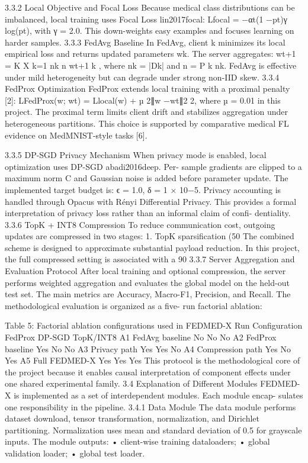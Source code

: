 3.3.2
Local Objective and Focal Loss
Because medical class distributions can be imbalanced, local training uses Focal Loss lin2017focal:
Lfocal = −αt(1 −pt)γ log(pt), with γ = 2.0. This down-weights easy examples and focuses learning on harder samples.
3.3.3
FedAvg Baseline
In FedAvg, client k minimizes its local empirical loss and returns updated parameters wk. The server aggregates:
wt+1 =
K
X k=1 nk n wt+1 k
, where nk = |Dk| and n = P k nk. FedAvg is effective under mild heterogeneity but can degrade under strong non-IID skew.
3.3.4
FedProx Optimization
FedProx extends local training with a proximal penalty [2]:
LFedProx(w; wt) = Llocal(w) + µ 2∥w −wt∥2 2, where µ = 0.01 in this project. The proximal term limits client drift and stabilizes aggregation under heterogeneous partitions. This choice is supported by comparative medical FL evidence on MedMNIST-style tasks [6].

3.3.5
DP-SGD Privacy Mechanism
When privacy mode is enabled, local optimization uses DP-SGD abadi2016deep. Per- sample gradients are clipped to a maximum norm C and Gaussian noise is added before parameter update. The implemented target budget is:
ϵ = 1.0, δ = 1 × 10−5.
Privacy accounting is handled through Opacus with Rényi Differential Privacy. This provides a formal interpretation of privacy loss rather than an informal claim of confi- dentiality.
3.3.6
TopK + INT8 Compression
To reduce communication cost, outgoing updates are compressed in two stages:
1. TopK sparsification (50%
The combined scheme is designed to approximate substantial payload reduction. In this project, the full compressed setting is associated with a 90%
3.3.7
Server Aggregation and Evaluation Protocol
After local training and optional compression, the server performs weighted aggregation and evaluates the global model on the held-out test set. The main metrics are Accuracy,
Macro-F1, Precision, and Recall. The methodological evaluation is organized as a five- run factorial ablation:

Table 5: Factorial ablation configurations used in FEDMED-X
Run
Configuration
FedProx
DP-SGD
TopK/INT8
A1
FedAvg baseline
No
No
No
A2
FedProx baseline
Yes
No
No
A3
Privacy path
Yes
Yes
No
A4
Compression path
Yes
No
Yes
A5
Full FEDMED-X
Yes
Yes
Yes
This protocol is the methodological core of the project because it enables causal interpretation of component effects under one shared experimental family.
3.4
Explanation of Different Modules
FEDMED-X is implemented as a set of interdependent modules. Each module encap- sulates one responsibility in the pipeline.
3.4.1
Data Module
The data module performs dataset download, tensor transformation, normalization, and Dirichlet partitioning. Normalization uses mean and standard deviation of 0.5 for grayscale inputs. The module outputs:
• client-wise training dataloaders;
• global validation loader;
• global test loader.

